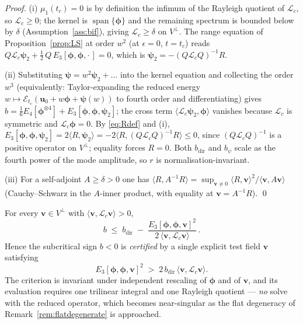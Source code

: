 \begin{proof}
    (i) $\mu_1(t_c)=0$ is by definition the infimum of the Rayleigh quotient of $\mathcal{L}_c$, so
    $\mathcal{L}_c\ge0$; the kernel is $\operatorname{span}\{\bm{\phi}\}$ and the remaining spectrum is bounded below
    by $\delta$ (Assumption~\ref{ass:bif}), giving $\mathcal{L}_c\ge\delta$ on $V^\perp$. The range equation of
    Proposition~\ref{prop:LS} at order $w^2$ (at $\epsilon=0$, $t=t_c$) reads
    $Q\mathcal{L}_c\bm{\psi}_2+\tfrac12\,Q\,E_3[\bm{\phi},\bm{\phi},\cdot\,]=0$, which is
    $\bm{\psi}_2=-(Q\mathcal{L}_cQ)^{-1}R$.

    (ii) Substituting $\bm{\psi}=w^2\bm{\psi}_2+\dots$ into the kernel equation and collecting the order $w^3$
    (equivalently: Taylor-expanding the reduced energy $w\mapsto\mathcal{E}_{t_c}(\bm{u}_0+w\bm{\phi}+\bm{\psi}(w))$
    to fourth order and differentiating) gives
    $b=\tfrac16E_4[\bm{\phi}^{\otimes4}]+E_3[\bm{\phi},\bm{\phi},\bm{\psi}_2]$; the cross term
    $\langle\mathcal{L}_c\bm{\psi}_2,\bm{\phi}\rangle$ vanishes because $\mathcal{L}_c$ is symmetric and
    $\mathcal{L}_c\bm{\phi}=0$. By \eqref{eq:Rdef} and (i),
    $E_3[\bm{\phi},\bm{\phi},\bm{\psi}_2]=2\langle R,\bm{\psi}_2\rangle
        =-2\langle R,(Q\mathcal{L}_cQ)^{-1}R\rangle\le0$, since $(Q\mathcal{L}_cQ)^{-1}$ is a positive operator on
    $V^\perp$; equality forces $R=0$. Both $b_{\mathrm{dir}}$ and $b_\psi$ scale as the fourth power of the mode
    amplitude, so $r$ is normalisation-invariant.

    (iii) For a self-adjoint $A\ge\delta>0$ one has $\langle R,A^{-1}R\rangle=\sup_{\bm{v}\neq0}\langle
        R,\bm{v}\rangle^2/\langle\bm{v},A\bm{v}\rangle$ (Cauchy--Schwarz in the $A$-inner product, with equality at
    $\bm{v}=A^{-1}R$). \qed
\end{proof}

\begin{corollary}
    \label{cor:cert}
    For every $\bm{v}\in V^\perp$ with $\langle\bm{v},\mathcal{L}_c\bm{v}\rangle>0$,
    \begin{equation}
        \label{eq:cert}
        b \;\le\; b_{\mathrm{dir}} \;-\; \frac{E_3[\bm{\phi},\bm{\phi},\bm{v}]^2}
        {2\,\langle\bm{v},\mathcal{L}_c\bm{v}\rangle}\,.
    \end{equation}
    Hence the subcritical sign $b<0$ is \emph{certified} by a single explicit test field $\bm{v}$ satisfying
    \begin{equation}
        \label{eq:certcrit}
        E_3[\bm{\phi},\bm{\phi},\bm{v}]^2 \;>\; 2\,b_{\mathrm{dir}}\,\langle\bm{v},\mathcal{L}_c\bm{v}\rangle .
    \end{equation}
    The criterion is invariant under independent rescaling of $\bm{\phi}$ and of $\bm{v}$, and its evaluation requires
    one trilinear integral and one Rayleigh quotient --- \emph{no} solve with the reduced operator, which becomes
    near-singular as the flat degeneracy of Remark~\ref{rem:flatdegenerate} is approached.
\end{corollary}

